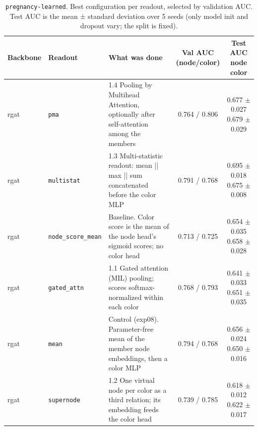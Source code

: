 \begin{table}[t]
\centering
\small
\begin{tabularx}{\textwidth}{llXcc}
\toprule
Backbone & Readout & What was done & \makecell{Val AUC\\(node/color)} & \makecell{Test AUC\\node\\color} \\
\midrule
rgat & \texttt{pma} & 1.4 Pooling by Multihead Attention, optionally after self-attention among the members & 0.764 / 0.806 & \makecell{0.677 $\pm$ 0.027\\0.679 $\pm$ 0.029} \\
rgat & \texttt{multistat} & 1.3 Multi-statistic readout: mean || max || sum concatenated before the color MLP & 0.791 / 0.768 & \makecell{0.695 $\pm$ 0.018\\0.675 $\pm$ 0.008} \\
rgat & \texttt{node\_score\_mean} & Baseline. Color score is the mean of the node head's sigmoid scores; no color head & 0.713 / 0.725 & \makecell{0.654 $\pm$ 0.035\\0.658 $\pm$ 0.028} \\
rgat & \texttt{gated\_attn} & 1.1 Gated attention (MIL) pooling; scores softmax-normalized within each color & 0.768 / 0.793 & \makecell{0.641 $\pm$ 0.033\\0.651 $\pm$ 0.035} \\
rgat & \texttt{mean} & Control (exp08). Parameter-free mean of the member node embeddings, then a color MLP & 0.794 / 0.768 & \makecell{0.656 $\pm$ 0.024\\0.650 $\pm$ 0.016} \\
rgat & \texttt{supernode} & 1.2 One virtual node per color as a third relation; its embedding feeds the color head & 0.739 / 0.785 & \makecell{0.618 $\pm$ 0.012\\0.622 $\pm$ 0.017} \\
\bottomrule
\end{tabularx}
\caption{\texttt{pregnancy-learned}. Best configuration per readout, selected by validation AUC. Test AUC is the mean ± standard deviation over 5 seeds (only model init and dropout vary; the split is fixed).}
\label{tab:exp09-pooling}
\end{table}
